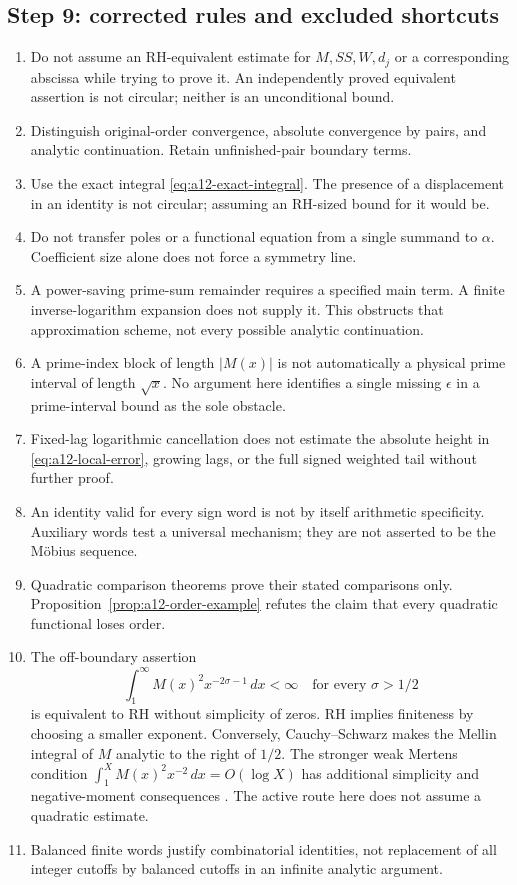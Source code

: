 \subsection{Step 9: corrected rules and excluded shortcuts}
\label{subsec:a12-rules}
\begin{enumerate}[label=\textup{R\arabic*.},leftmargin=*]
\item Do not assume an RH-equivalent estimate for $M,SS,W,d_j$ or a
corresponding abscissa while trying to prove it. An independently proved
equivalent assertion is not circular; neither is an unconditional bound.
\item Distinguish original-order convergence, absolute convergence by
pairs, and analytic continuation. Retain unfinished-pair boundary terms.
\item Use the exact integral \eqref{eq:a12-exact-integral}. The presence of
a displacement in an identity is not circular; assuming an RH-sized
bound for it would be.
\item Do not transfer poles or a functional equation from a single
summand to $\alpha$. Coefficient size alone does not force a symmetry line.
\item A power-saving prime-sum remainder requires a specified main term.
A finite inverse-logarithm expansion does not supply it. This obstructs
that approximation scheme, not every possible analytic continuation.
\item A prime-index block of length $|M(x)|$ is not automatically a
physical prime interval of length $\sqrt x$. No argument here identifies
a single missing $\epsilon$ in a prime-interval bound as the sole obstacle.
\item Fixed-lag logarithmic cancellation does not estimate the absolute
height in \eqref{eq:a12-local-error}, growing lags, or the full signed
weighted tail without further proof.
\item An identity valid for every sign word is not by itself arithmetic
specificity. Auxiliary words test a universal mechanism; they are not
asserted to be the M\"obius sequence.
\item Quadratic comparison theorems prove their stated comparisons only.
Proposition~\ref{prop:a12-order-example} refutes the claim that every
quadratic functional loses order.
\item The off-boundary assertion
\begin{equation}
\label{eq:a12-L2-correction}
\int_1^\infty M(x)^2x^{-2\sigma-1}\,dx<\infty
\quad\text{for every }\sigma>1/2
\end{equation}
is equivalent to RH without simplicity of zeros. RH implies finiteness
by choosing a smaller exponent. Conversely, Cauchy--Schwarz makes the
Mellin integral of $M$ analytic to the right of $1/2$.
The stronger weak Mertens condition
$\int_1^X M(x)^2x^{-2}\,dx=O(\log X)$ has additional simplicity and
negative-moment consequences \cite{Ng2004}.
The active route here does not assume a quadratic estimate.
\item Balanced finite words justify combinatorial identities, not
replacement of all integer cutoffs by balanced cutoffs in an infinite
analytic argument.
\end{enumerate}

